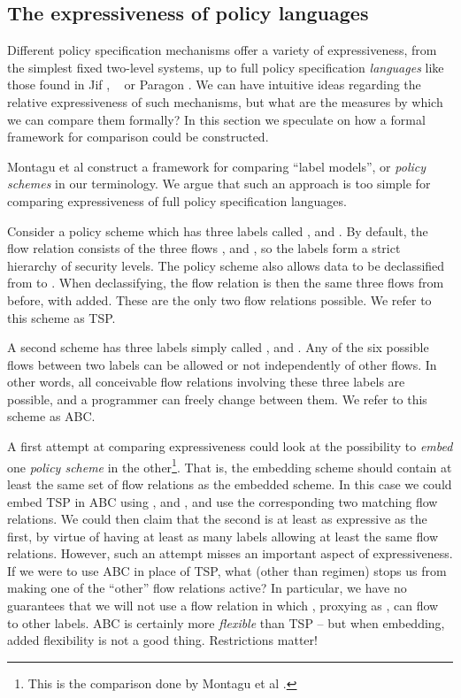 \subsection{The expressiveness of policy languages}
\label{sec:pollang:expressivity}

Different policy specification mechanisms offer a variety of expressiveness, from the
simplest fixed two-level systems, up to full policy specification \emph{languages}
like those found in Jif \cite{jif}, \Rx{}~\cite{Swamy+:Managing} or Paragon \cite{Paragon}.
We can have intuitive ideas regarding the relative expressiveness of such mechanisms,
but what are the measures by which we can compare them formally? In this section we speculate
on how a formal framework for comparison could be constructed.



Montagu et al \cite{Montagu13} construct a framework for comparing ``label models'',
or \emph{policy schemes} in our terminology. We argue that such an approach is too simple
for comparing expressiveness of full policy specification languages.

Consider a policy scheme which has three labels called ,  and .
      By default, the flow relation consists of the three flows 
      , 
      and , so the labels form a strict hierarchy
      of security levels. The policy scheme also allows data to be declassified from 
      to . When declassifying, the flow relation is then the same three flows from before,
      with  added. These are the only two flow relations
      possible. We refer to this scheme as TSP.

A second scheme has three labels simply called ,  and . Any of the six possible
    flows between two labels can be allowed or not independently of other flows. In other words,
    all  conceivable flow relations involving these three labels are possible, and a
    programmer can freely change between them. We refer to this scheme as ABC.

A first attempt at comparing expressiveness could look at the possibility to \emph{embed} one
\emph{policy scheme} in the other\footnote{This is the comparison done by Montagu et al \cite{Montagu13}.}.
That is, the embedding scheme should contain at least the same set of flow relations as the embedded scheme.
In this case we could embed TSP in ABC using
,  and , and use the corresponding
two matching flow relations. We could then claim that the second is at least as
expressive as the first, by virtue of having at least as many labels allowing at least
the same flow relations. However, such an attempt misses an important aspect of expressiveness.
If we were to use ABC in place of TSP, what (other than regimen) stops us from making
one of the ``other'' flow relations active? In particular, we have no guarantees that we will
not use a flow relation in which , proxying as , can flow to other labels.
ABC is certainly more \emph{flexible} than TSP -- but when embedding, added
flexibility is not a good thing. Restrictions matter!

